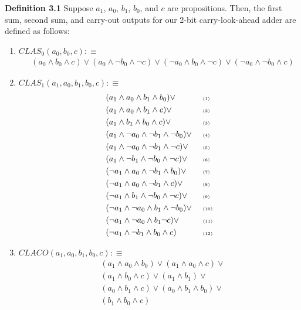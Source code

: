 \documentclass{article}
\begin{document}
\noindent \textbf{Definition 3.1} Suppose $a_1$, $a_0$, $b_1$, $b_0$, and $c$ are propositions. Then, the first sum, second sum, and carry-out outputs for our 2-bit carry-look-ahead adder are defined as follows: 
\begin{enumerate}
	\item 
	$ CLAS_0(a_0, b_0, c) :\equiv $
	\begin{align*}  
	&(a_0 \land b_0 \land c) \lor 
	   (a_0 \land \lnot b_0 \land \lnot c) \lor 
	   (\lnot a_0 \land b_0 \land \lnot c) \lor
	   (\lnot a_0 \land \lnot b_0 \land c)
	\end{align*}
	
 	\item
 	$ CLAS_1(a_1, a_0, b_1, b_0, c) :\equiv $
 	\begin{align*}   
	& (a_1 \land a_0 \land b_1 \land b_0)  \lor  && \text{ \tiny (1)} \\
	& (a_1 \land a_0 \land b_1 \land c) \lor && \text{ \tiny (2)} \\ 
	& (a_1 \land b_1 \land b_0 \land c) \lor  && \text{ \tiny (3)} \\
	& (a_1 \land \lnot a_0 \land \lnot b_1 \land \lnot b_0) \lor  && \text{ \tiny (4)} \\
	& (a_1 \land \lnot a_0 \land \lnot b_1 \land \lnot c) \lor  && \text{ \tiny (5)} \\
	& (a_1 \land \lnot b_1 \land \lnot  b_0 \land \lnot c) \lor  && \text{ \tiny (6)} \\
	& (\lnot a_1 \land a_0 \land \lnot b_1 \land b_0) \lor  && \text{ \tiny (7)} \\
	& (\lnot a_1 \land a_0 \land \lnot b_1 \land c) \lor  && \text{ \tiny (8)} \\
	& (\lnot a_1 \land b_1 \land \lnot b_0 \land \lnot c) \lor  && \text{ \tiny (9)} \\
	& (\lnot a_1 \land \lnot a_0 \land b_1 \land \lnot b_0) \lor && \text{ \tiny (10)} \\
	& (\lnot a_1 \land \lnot a_0 \land b_1 \lnot c) \lor  && \text{ \tiny (11)} \\
	& (\lnot a_1 \land \lnot b_1 \land b_0 \land c) && \text{ \tiny (12)}
	\end{align*}
\newpage
	\item 
	$ CLACO(a_1, a_0, b_1, b_0, c) :\equiv $
	\begin{align*} 
	 & (a_1 \land a_0 \land b_0) \lor
	   	 (a_1 \land a_0 \land c) \lor \\
	 & (a_1 \land b_0 \land c) \lor 
	 	 (a_1 \land b_1) \lor \\
	 &  (a_0 \land b_1 \land c) \lor 
	     (a_0 \land b_1 \land b_0) \lor \\
	 & (b_1 \land b_0 \land c) 
	\end{align*}
	   
\end{enumerate}
\end{document}

